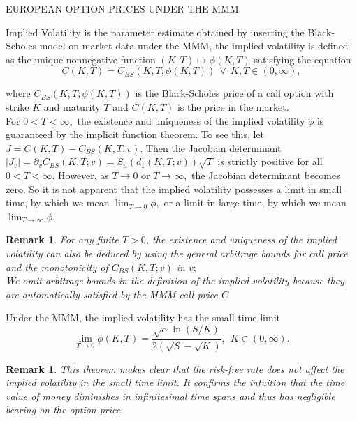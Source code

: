 \documentclass[unknownkeysallowed, compress]{beamer}
\theoremstyle{plain}
\newtheorem{remark}[theorem]{\textbf{Remark}}
\begin{document}
\begin{frame}[allowframebreaks]{EUROPEAN OPTION PRICES UNDER THE MMM}
\begin{definition}\label{4.1}
\normalfont
Implied Volatility is the parameter estimate obtained by inserting the Black-Scholes model on market data under the MMM, the implied volatility is defined as the unique nonnegative function $(K,T)\mapsto\phi(K,T)$ satisfying the equation
\begin{equation}\label{4.10}
C(K,T) = C_{BS}(K,T;\phi(K,T))~~\forall~~K,T\in(0,\infty),
\end{equation}
\end{definition}
where $C_{BS}(K,T;\phi(K,T))$ is the Black-Scholes price of a call option with strike $K$ and maturity $T$ and $C(K,T)$ is the price in the market.\\
For $0 < T < \infty,$ the existence and uniqueness of the implied volatility $\phi$ is guaranteed
by the implicit function theorem. To see this, let $J = C(K, T) - C_{BS}(K, T; v)$. Then the
Jacobian determinant $|J_v| = \partial_vC_{BS}(K, T; v) = S_n(d_1(K,T;v))\sqrt{T}$ is strictly positive for all $0 < T < \infty$. However, as $T \rightarrow 0$ or $T \rightarrow \infty,$ the Jacobian determinant becomes zero. So it is not apparent that the implied volatility possesses a limit in small time, by which we mean $\lim_{T\rightarrow0}\phi,$ or a limit in large time, by which we mean $\lim_{T\rightarrow\infty}\phi.$
\begin{remark}\label{R1}
\normalfont
For any finite $T > 0$, the existence and uniqueness of the implied volatility can
also be deduced by using the general arbitrage bounds for call price and the monotonicity
of $C_{BS}(K, T; v)$ in $v;$\\%
 We omit arbitrage bounds in the definition of the
implied volatility because they are automatically satisfied by the MMM call price $C$%
\end{remark}

\begin{theorem}\cite[pg.~9]{guo2011small}\label{T4.1}
Under the MMM, the implied volatility has the small time limit
\begin{equation}\label{4.11}
\lim_{T\rightarrow 0}\phi(K,T) = \frac{\sqrt{\alpha}\ln(S/K)}{2(\sqrt{S} - \sqrt{K})},~~K\in(0,\infty).
\end{equation}
\end{theorem}
\begin{remark}
\normalfont
This theorem makes clear that the risk-free rate does not affect the implied volatility in
the small time limit. It confirms the intuition that the time value of money diminishes in
infinitesimal time spans and thus has negligible bearing on the option price.
\end{remark}
\end{frame}
\end{document}
